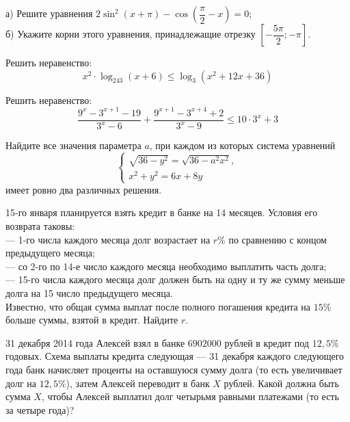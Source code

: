 \begin{homework}[number=3]
	\begin{listofex}
		\item
		а) Решите уравнения
		\( 2\sin^2(x+\pi)-\cos\left( \dfrac{\pi}{2}-x \right)=0 \);\\
		б) Укажите корни этого уравнения, принадлежащие отрезку
		\( \left[ -\dfrac{5\pi}{2};-\pi \right] \).
		\item Решить неравенство:
		\[ x^2\cdot\log_{243}(x+6)\le\log_3(x^2+12x+36) \]
		\item Решить неравенство:
		\[ \dfrac{9^x-3^{x+1}-19}{3^x-6}+\dfrac{9^{x+1}-3^{x+4}+2}{3^x-9}\le10\cdot3^x+3 \]
		\item Найдите все значения параметра \( a \), при каждом из которых система уравнений
		\[ \left\{
		\begin{array}{l}
			\sqrt{36-y^2}=\sqrt{36-a^2x^2},\\
			x^2+y^2=6x+8y
		\end{array}
		\right. \]
		имеет ровно два различных решения.
		\item 15‐го января планируется взять кредит в банке на 14 месяцев. Условия его возврата таковы:\\
		— 1-го числа каждого месяца долг возрастает на \( r\% \) по сравнению с концом предыдущего месяца;\\
		— со 2-го по 14-е число каждого месяца необходимо выплатить часть долга;\\
		— 15-го числа каждого месяца долг должен быть на одну и ту же сумму меньше долга на 15 число предыдущего месяца.\\
		Известно, что общая сумма выплат после полного погашения кредита на \( 15\% \) больше суммы, взятой в кредит. Найдите \( r \).
		\item 31 декабря 2014 года Алексей взял в банке \( 6 902 000 \) рублей в кредит под \( 12,5\% \) годовых. Схема выплаты кредита следующая  — 31 декабря каждого следующего года банк начисляет проценты на оставшуюся сумму долга (то есть увеличивает долг на \( 12,5\% \)), затем Алексей переводит в банк \( X \) рублей. Какой должна быть сумма \( X \), чтобы Алексей выплатил долг четырьмя равными платежами (то есть за четыре года)?
	\end{listofex}
\end{homework}

